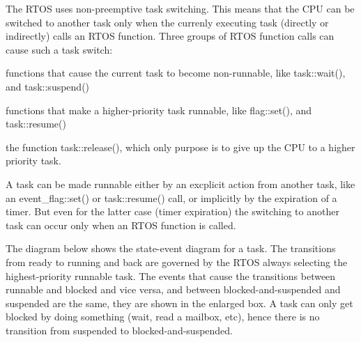 The R\+T\+OS uses non-\/preemptive task switching. This means that the C\+PU can be switched to another task only when the currenly executing task (directly or indirectly) calls an R\+T\+OS function. Three groups of R\+T\+OS function calls can cause such a task switch\+:


\begin{DoxyEnumerate}
\item functions that cause the current task to become non-\/runnable, like task\+::wait(), and task\+::suspend()
\item functions that make a higher-\/priority task runnable, like flag\+::set(), and task\+::resume()
\item the function task\+::release(), which only purpose is to give up the C\+PU to a higher priority task.
\end{DoxyEnumerate}

A task can be made runnable either by an excplicit action from another task, like an event\+\_\+flag\+::set() or task\+::resume() call, or implicitly by the expiration of a timer. But even for the latter case (timer expiration) the switching to another task can occur only when an R\+T\+OS function is called.

The diagram below shows the state-\/event diagram for a task. The transitions from ready to running and back are governed by the R\+T\+OS always selecting the highest-\/priority runnable task. The events that cause the transitions between runnable and blocked and vice versa, and between blocked-\/and-\/suspended and suspended are the same, they are shown in the enlarged box. A task can only get blocked by doing something (wait, read a mailbox, etc), hence there is no transition from suspended to blocked-\/and-\/suspended. 